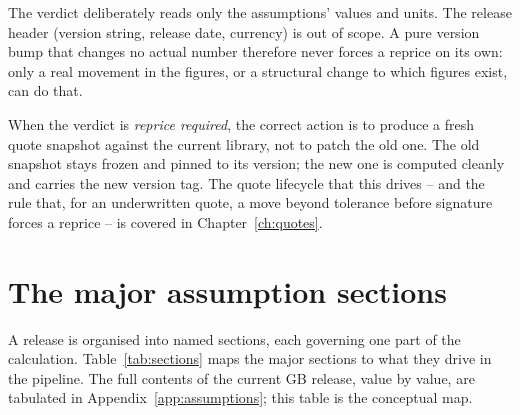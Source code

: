 \begin{plainnote}
The verdict deliberately reads only the assumptions' values and units. The release header (version string, release date, currency) is out of scope. A pure version bump that changes no actual number therefore never forces a reprice on its own: only a real movement in the figures, or a structural change to which figures exist, can do that.
\end{plainnote}

When the verdict is \emph{reprice required}, the correct action is to produce a fresh quote snapshot against the current library, not to patch the old one. The old snapshot stays frozen and pinned to its version; the new one is computed cleanly and carries the new version tag. The quote lifecycle that this drives -- and the rule that, for an underwritten quote, a move beyond tolerance before signature forces a reprice -- is covered in Chapter~\ref{ch:quotes}.

\section{The major assumption sections}

A release is organised into named sections, each governing one part of the calculation. Table~\ref{tab:sections} maps the major sections to what they drive in the pipeline. The full contents of the current GB release, value by value, are tabulated in Appendix~\ref{app:assumptions}; this table is the conceptual map.

